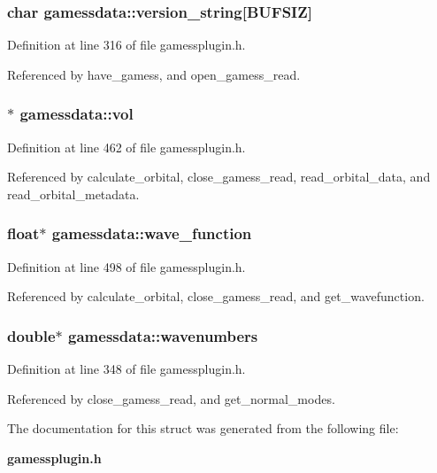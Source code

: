 \subsubsection{\setlength{\rightskip}{0pt plus 5cm}char gamessdata::version\_\-string[BUFSIZ]}\label{structgamessdata_m15}




Definition at line 316 of file gamessplugin.h.

Referenced by have\_\-gamess, and open\_\-gamess\_\-read.
\subsubsection{$\ast$ gamessdata::vol}\label{structgamessdata_m60}




Definition at line 462 of file gamessplugin.h.

Referenced by calculate\_\-orbital, close\_\-gamess\_\-read, read\_\-orbital\_\-data, and read\_\-orbital\_\-metadata.
\subsubsection{\setlength{\rightskip}{0pt plus 5cm}float$\ast$ gamessdata::wave\_\-function}\label{structgamessdata_m67}




Definition at line 498 of file gamessplugin.h.

Referenced by calculate\_\-orbital, close\_\-gamess\_\-read, and get\_\-wavefunction.
\subsubsection{\setlength{\rightskip}{0pt plus 5cm}double$\ast$ gamessdata::wavenumbers}\label{structgamessdata_m28}




Definition at line 348 of file gamessplugin.h.

Referenced by close\_\-gamess\_\-read, and get\_\-normal\_\-modes.

The documentation for this struct was generated from the following file:\begin{CompactItemize}
\item 
{\bf gamessplugin.h}\end{CompactItemize}
